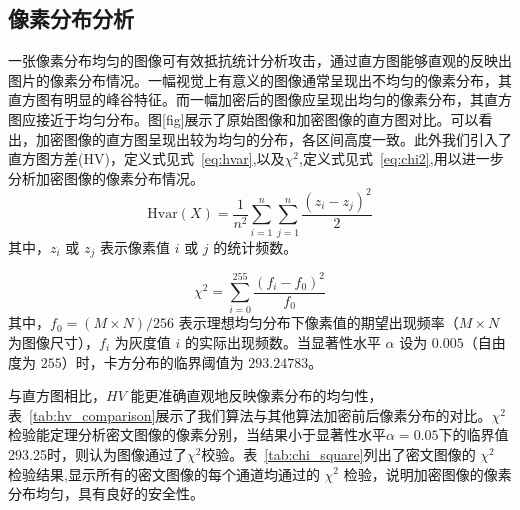 \subsection{像素分布分析}
一张像素分布均匀的图像可有效抵抗统计分析攻击，通过直方图能够直观的反映出图片的像素分布情况。一幅视觉上有意义的图像通常呈现出不均匀的像素分布，其直方图有明显的峰谷特征。而一幅加密后的图像应呈现出均匀的像素分布，其直方图应接近于均匀分布。图[fig]展示了原始图像和加密图像的直方图对比。可以看出，加密图像的直方图呈现出较为均匀的分布，各区间高度一致。此外我们引入了直方图方差(HV)，定义式见式~\eqref{eq:hvar},以及$\chi^2$,定义式见式~\eqref{eq:chi2},用以进一步分析加密图像的像素分布情况。
\begin{equation}
\label{eq:hvar}
\mathrm{Hvar}(X) = \frac{1}{n^2} \sum_{i=1}^{n} \sum_{j=1}^{n} \frac{(z_i - z_j)^2}{2}
\end{equation}
其中，$z_i$ 或 $z_j$ 表示像素值 $i$ 或 $j$ 的统计频数。

\begin{equation}
\label{eq:chi2}
\chi^2 = \sum_{i=0}^{255} \frac{(f_i - f_0)^2}{f_0}
\end{equation}
其中，$f_0 = (M \times N) / 256$ 表示理想均匀分布下像素值的期望出现频率（$M \times N$ 为图像尺寸），$f_i$ 为灰度值 $i$ 的实际出现频数。当显著性水平 $\alpha$ 设为 $0.005$（自由度为 $255$）时，卡方分布的临界阈值为 $293.24783$。

与直方图相比，$HV$ 能更准确直观地反映像素分布的均匀性，表~\ref{tab:hv_comparison}展示了我们算法与其他算法加密前后像素分布的对比。$\chi^2$检验能定理分析密文图像的像素分别，当结果小于显著性水平$\alpha=0.05$下的临界值293.25时，则认为图像通过了$\chi^2$校验。表~\ref{tab:chi_square}列出了密文图像的 $\chi^2$ 检验结果,显示所有的密文图像的每个通道均通过的 $\chi^2$ 检验，说明加密图像的像素分布均匀，具有良好的安全性。

